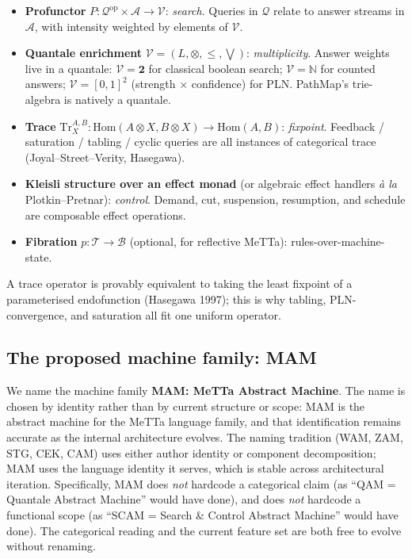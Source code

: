 \documentclass[11pt]{article}
\newcommand{\PathMap}{\textup{PathMap}}
\begin{document}
\begin{itemize}
\item \textbf{Profunctor} $P : \mathcal{Q}^{\mathrm{op}} \times
  \mathcal{A} \to \mathcal{V}$: \emph{search}.  Queries in
  $\mathcal{Q}$ relate to answer streams in $\mathcal{A}$, with
  intensity weighted by elements of $\mathcal{V}$.
\item \textbf{Quantale enrichment} $\mathcal{V} = (L, \otimes, \le,
  \bigvee)$: \emph{multiplicity}.  Answer weights live in a quantale:
  $\mathcal{V} = \mathbf{2}$ for classical boolean search;
  $\mathcal{V} = \mathbb{N}$ for counted answers;
  $\mathcal{V} = [0,1]^2$ (strength $\times$ confidence) for PLN.
  \PathMap{}'s trie-algebra is natively a quantale.
\item \textbf{Trace} $\mathrm{Tr}_X^{A,B} : \mathrm{Hom}(A \otimes X, B
  \otimes X) \to \mathrm{Hom}(A, B)$: \emph{fixpoint}.  Feedback /
  saturation / tabling / cyclic queries are all instances of
  categorical trace (Joyal--Street--Verity, Hasegawa).
\item \textbf{Kleisli structure over an effect monad} (or algebraic
  effect handlers \emph{\`a la} Plotkin--Pretnar): \emph{control}.
  Demand, cut, suspension, resumption, and schedule are composable
  effect operations.
\item \textbf{Fibration} $p : \mathcal{T} \to \mathcal{B}$ (optional,
  for reflective MeTTa): rules-over-machine-state.
\end{itemize}

A trace operator is provably equivalent to taking the least fixpoint
of a parameterised endofunction (Hasegawa 1997); this is why tabling,
PLN-convergence, and saturation all fit one uniform operator.

\subsection{The proposed machine family: MAM}

We name the machine family \textbf{MAM: MeTTa Abstract Machine}.
The name is chosen by identity rather than by current structure or
scope: MAM is the abstract machine for the MeTTa language family,
and that identification remains accurate as the internal architecture
evolves.  The naming tradition (WAM, ZAM, STG, CEK, CAM) uses either
author identity or component decomposition; MAM uses the language
identity it serves, which is stable across architectural iteration.
Specifically, MAM does \emph{not} hardcode a categorical claim (as
``QAM = Quantale Abstract Machine'' would have done), and does
\emph{not} hardcode a functional scope (as ``SCAM = Search \& Control
Abstract Machine'' would have done).  The categorical reading and the
current feature set are both free to evolve without renaming.
\end{document}
